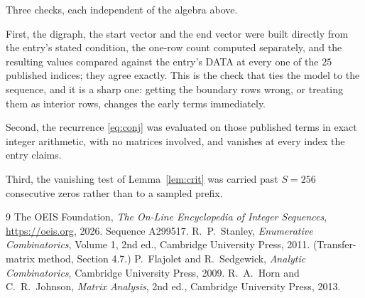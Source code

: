 \documentclass[11pt,a4paper]{article}
\theoremstyle{plain}
\theoremstyle{definition}
\begin{document}
Three checks, each independent of the algebra above.

First, the digraph, the start vector and the end vector were built directly from the
entry's stated condition, the one-row count computed separately, and the resulting values
compared against the entry's DATA at every one of the $25$ published indices; they
agree exactly. This is the check that ties the model to the sequence, and it is a sharp one:
getting the boundary rows wrong, or treating them as interior rows, changes the early terms
immediately.

Second, the recurrence \eqref{eq:conj} was evaluated on those published terms in exact
integer arithmetic, with no matrices involved, and vanishes at every index the entry claims.

Third, the vanishing test of Lemma~\ref{lem:crit} was carried past $S=256$ consecutive
zeros rather than to a sampled prefix.

\begin{thebibliography}{9}
 The OEIS Foundation, \emph{The On-Line Encyclopedia of Integer
Sequences}, \url{https://oeis.org}, 2026. Sequence A299517.
 R.~P.~Stanley, \emph{Enumerative Combinatorics}, Volume 1, 2nd ed.,
Cambridge University Press, 2011. (Transfer-matrix method, Section 4.7.)
 P.~Flajolet and R.~Sedgewick, \emph{Analytic Combinatorics}, Cambridge
University Press, 2009.
 R.~A.~Horn and C.~R.~Johnson, \emph{Matrix Analysis}, 2nd ed., Cambridge
University Press, 2013.
\end{thebibliography}
\end{document}
